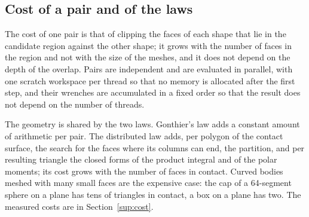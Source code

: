 \subsection{Cost of a pair and of the laws}

The cost of one pair is that of clipping the faces of each shape that lie in the candidate
region against the other shape; it grows with the number of faces in the region and not with the
size of the meshes, and it does not depend on the depth of the overlap. Pairs are independent
and are evaluated in parallel, with one scratch workspace per thread so that no memory is
allocated after the first step, and their wrenches are accumulated in a fixed order so that the
result does not depend on the number of threads.

The geometry is shared by the two laws. Gonthier's law adds a constant amount of arithmetic per
pair. The distributed law adds, per polygon of the contact surface, the search for the faces
where its columns can end, the partition, and per resulting triangle the closed forms of
the product integral and of the polar moments; its cost grows with the number of faces in
contact. Curved bodies meshed with many small faces are the expensive case: the cap of a
64-segment sphere on a plane has tens of triangles in contact, a box on a plane has two. The
measured costs are in Section~\ref{sup:cost}.
